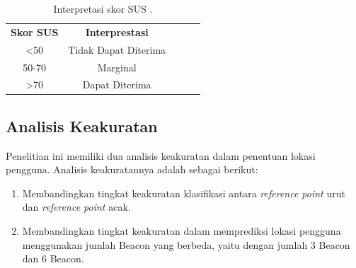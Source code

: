 \begin{table}[H]
\center
\caption{Interpretasi skor SUS \citep{Bangoor2009}.}
\label{tabelsus}
\begin{tabular}{|c|c|lll}
\cline{1-2}
\textbf{Skor SUS} & \textbf{Interprestasi} &  &  &  \\ \cline{1-2}
\textless{}50     & Tidak Dapat Diterima   &  &  &  \\ \cline{1-2}
50-70             & Marginal               &  &  &  \\ \cline{1-2}
\textgreater{}70  & Dapat Diterima         &  &  &  \\ \cline{1-2}
\end{tabular}
\end{table}

\subsection{Analisis Keakuratan}
Penelitian ini memiliki dua analisis keakuratan dalam penentuan lokasi pengguna. Analisis keakuratannya adalah sebagai berikut:
\begin{enumerate}[1.]
\item Membandingkan tingkat keakuratan klasifikasi antara \textit{reference point} urut dan \textit{reference point} acak.
\item Membandingkan tingkat keakuratan dalam memprediksi lokasi pengguna menggunakan jumlah Beacon yang berbeda, yaitu dengan jumlah 3 Beacon dan 6 Beacon.
\end{enumerate}
